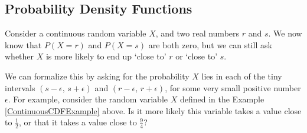 \subsection*{Probability Density Functions}
Consider a continuous random variable $X$, and two real numbers $r$ and $s$. We now know that $P(X = r)$ and $P(X = s)$ are both zero, but we can still ask whether $X$ is more likely to end up `close to' $r$ or `close to' $s$.
\par
We can formalize this by asking for the probability $X$ lies in each of the tiny intervals $(s-\epsilon,\, s + \epsilon)$ and $(r-\epsilon, \,r+ \epsilon)$, for some very small positive number $\epsilon$. For example, consider the random variable $X$ defined in the Example \ref{ContinuousCDFExample} above. Is it more likely this variable takes a value close to $\frac{1}{2}$, or that it takes a value close to $\frac{9}{4}$?

